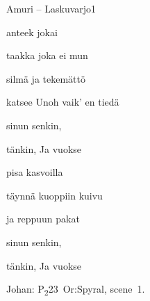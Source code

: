 \documentclass[12pt,a4paper]{article}
\begin{document}
\thispagestyle{empty}
\begin{mysong}{Amuri – Laskuvarjo}{1}

\begin{SBVerse}
   anteek  jokai

   taakka  joka ei mun 

   silmä ja  tekemättö

   katsee Unoh vaik' en tiedä
\end{SBVerse}

\begin{SBChorus}
   sinun   senkin, 

   tänkin,  Ja  
  vuokse
\end{SBChorus}


\begin{SBVerse}
    pisa kasvoilla 

   täynnä   kuoppiin
  kuivu

    ja  reppuun
  pakat
\end{SBVerse}

\begin{SBChorus}
   sinun   senkin, 

   tänkin,  Ja  
  vuokse
\end{SBChorus}

{\SBLyricNoteFont Johan: P\textsubscript{2}23~Or:Spyral, scene~1.}

\end{mysong}
\end{document}
